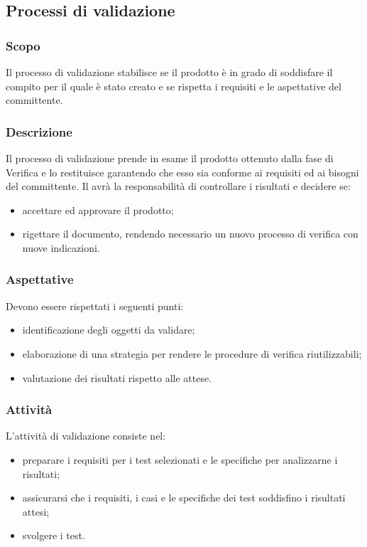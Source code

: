 \subsection{Processi di validazione}
\subsubsection{Scopo}
Il processo di validazione stabilisce se il prodotto è in grado di soddisfare il compito per il quale è stato creato e se rispetta i requisiti e le aspettative del committente.
\subsubsection{Descrizione}
Il processo di validazione prende in esame il prodotto ottenuto dalla fase di Verifica e lo restituisce garantendo che esso sia conforme ai requisiti ed ai bisogni del committente.
Il \RdP{} avrà la responsabilità di controllare i risultati e decidere se:
\begin{itemize}
	\item accettare ed approvare il prodotto;
	\item rigettare il documento, rendendo necessario un nuovo processo di verifica con nuove indicazioni.
\end{itemize}
\subsubsection{Aspettative}
Devono essere rispettati i seguenti punti:
\begin{itemize}
	\item identificazione degli oggetti da validare;
	\item elaborazione di una strategia per rendere le procedure di verifica riutilizzabili;
	\item valutazione dei risultati rispetto alle attese.
\end{itemize}

\subsubsection{Attività}
L'attività di validazione consiste nel:
\begin{itemize}
	\item preparare i requisiti per i test selezionati e le specifiche per analizzarne i risultati;
	\item assicurarsi che i requisiti, i casi e le specifiche dei test soddisfino i risultati attesi;
	\item svolgere i test.
\end{itemize}

